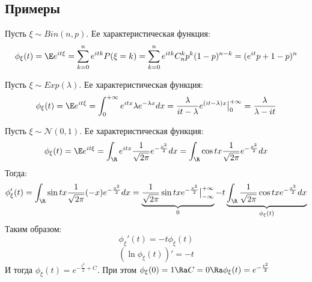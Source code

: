 \subsection{Примеры}
\begin{example}
    Пусть \(\xi \sim Bin(n, p)\). Ее характеристическая функция:
    \[\phi_\xi(t) = \E e^{it\xi} = \sum_{k = 0}^n e^{itk}P(\xi = k) = \sum_{k = 0}^n e^{itk}C_n^kp^k(1 - p)^{n - k} = (e^{it}p + 1 - p)^n\]
\end{example}

\begin{example}
    Пусть \(\xi \sim Exp(\lambda)\). Ее характеристическая функция:
    \[\phi_\xi(t) = \E e^{it\xi} = \int_0^{+\infty} e^{itx}\lambda e^{-\lambda x}dx = \frac{\lambda}{it - \lambda}e^{(it-\lambda)x}\big|_0^{+\infty} = \frac{\lambda}{\lambda - it}\]
\end{example}

\begin{example}
    Пусть \(\xi \sim \mathcal{N}(0, 1)\). Ее характеристическая функция:
    \[\phi_\xi(t) = \E e^{it\xi} = \int_\R e^{itx}\frac{1}{\sqrt{2\pi}}e^{-\frac{x^2}{2}}dx = \int_\R \cos tx \frac{1}{\sqrt{2\pi}}e^{-\frac{x^2}{2}}dx\]
    Тогда:
    \[\phi_\xi'(t) = \int_\R \sin tx \frac{1}{\sqrt{2\pi}}(-x)e^{-\frac{x^2}{2}}dx = \underbrace{\frac{1}{\sqrt{2\pi}}\sin tx e^{-\frac{x^2}{2}}\big|_{-\infty}^{+\infty}}_0 - t\underbrace{\int_\R\frac{1}{\sqrt{2\pi}}\cos tx e^{-\frac{x^2}{2}}dx}_{\phi_\xi(t)}\]
    Таким образом:
    \[\phi_\xi'(t) = -t \phi_\xi(t)\]
    \[(\ln\phi_\xi(t))' = -t\]
    И тогда \(\phi_\xi(t) = e^{-\frac{t^2}{2} + C}\). При этом \(\phi_\xi(0) = 1 \Ra C = 0 \Ra \phi_\xi(t) = e^{-\frac{t^2}{2}}\)
\end{example}

